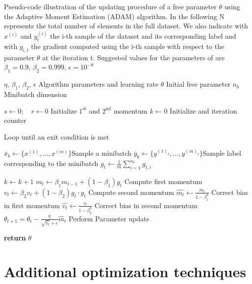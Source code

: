 \begin{algorithm}[H]
\caption{Pseudo-code illustration of the updating procedure of a free parameter $\theta$ using the Adaptive Moment Estimation (ADAM) algorithm. In the following N represents the total number of elements in the full dataset. We also indicate with $x^{(i)}$ and $y^{(i)}_t$ the i-th sample of the dataset and its corresponding label and with $g_{i,t}$ the gradient computed using the i-th sample with respect to the parameter $\theta$ at the iteration t. Suggested values for the parameters of are $\beta_1=0.9,\,\beta_2=0.999,\,\epsilon=10^{-8}$}\label{alg:adam}
\begin{algorithmic}[1]
\Require $\eta ,\, \beta_1,\,\beta_2,\,\epsilon$ \Comment Algorithm parameters and learning rate
\Require ${\theta}$ \Comment Initial free parameter
\Require $n_b$\Comment Minibatch dimension 

\State $s\gets 0;\quad r\gets 0$ \Comment Initialize $1^\text{st}$ and $2^\text{nd}$ momentum 
\State $k\gets 0$ \Comment Initialize and iteration counter

 \Comment Loop until an exit condition is met

\State $\bar{x}_b \gets \{x^{(1)},\dots,x^{(m)}\}$\Comment Sample a minibatch
\State $\bar{y}_b \gets \{y^{(1)_t},\dots,y^{(m)_t}\}$\Comment Sample label corresponding to the minibatch
\State ${g}_t \gets  \frac{1}{m} \sum_{i=1}^{n_b} g_{t,i}$ 

\State $k \gets k+1$
\State $m_t \gets \beta_1 m_{t-1} + (1-\beta_1) g_t$    \Comment Compute first momentum
\State $v_t \gets \beta_2 v_t + (1-\beta_2) g_t \cdot g_t$    \Comment Compute second momentum
\State $\hat{m_t} \gets \frac{m_t}{1 - \beta^k_1}$   \Comment Correct bias in first momentum
\State $\hat{v_t} \gets \frac{v_t}{1 - \beta^k_2}$   \Comment Correct bias in second momentum
\State $\theta_{t+1}=\theta_{t}-\frac{\eta}{\sqrt{\hat{v}_{t}}+\epsilon} \hat{m}_{t}$
\Comment Perform Parameter update
\EndWhile

\State \textbf{return} ${\theta}$
\EndProcedure
\end{algorithmic}
\end{algorithm}

\section{Additional optimization techniques} \label{opt_tec}

